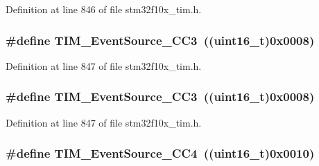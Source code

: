 Definition at line 846 of file stm32f10x\+\_\+tim.\+h.

\subsubsection[{\texorpdfstring{T\+I\+M\+\_\+\+Event\+Source\+\_\+\+C\+C3}{TIM_EventSource_CC3}}]{\setlength{\rightskip}{0pt plus 5cm}\#define T\+I\+M\+\_\+\+Event\+Source\+\_\+\+C\+C3~(({\bf uint16\+\_\+t})0x0008)}\hypertarget{group___t_i_m___event___source_gafeb8538e3b00d938e061e5051f83836b}{}\label{group___t_i_m___event___source_gafeb8538e3b00d938e061e5051f83836b}


Definition at line 847 of file stm32f10x\+\_\+tim.\+h.

\subsubsection[{\texorpdfstring{T\+I\+M\+\_\+\+Event\+Source\+\_\+\+C\+C3}{TIM_EventSource_CC3}}]{\setlength{\rightskip}{0pt plus 5cm}\#define T\+I\+M\+\_\+\+Event\+Source\+\_\+\+C\+C3~(({\bf uint16\+\_\+t})0x0008)}\hypertarget{group___t_i_m___event___source_gafeb8538e3b00d938e061e5051f83836b}{}\label{group___t_i_m___event___source_gafeb8538e3b00d938e061e5051f83836b}


Definition at line 847 of file stm32f10x\+\_\+tim.\+h.

\subsubsection[{\texorpdfstring{T\+I\+M\+\_\+\+Event\+Source\+\_\+\+C\+C4}{TIM_EventSource_CC4}}]{\setlength{\rightskip}{0pt plus 5cm}\#define T\+I\+M\+\_\+\+Event\+Source\+\_\+\+C\+C4~(({\bf uint16\+\_\+t})0x0010)}\hypertarget{group___t_i_m___event___source_gab60e3190e6c09d2d067f2c689d614979}{}\label{group___t_i_m___event___source_gab60e3190e6c09d2d067f2c689d614979}


